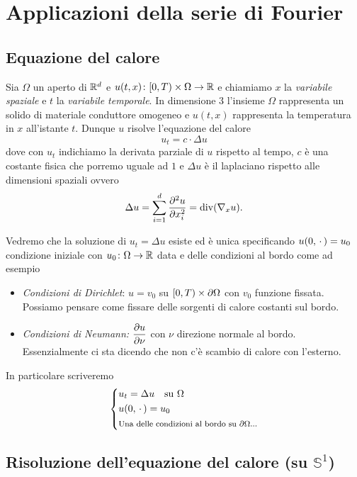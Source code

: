 \chapter{Applicazioni della serie di Fourier}

\section{Equazione del calore}

Sia $\Omega$ un aperto di $\mathbb R^d$ e $u(t, x) \colon [0, T) \times \Omega \to \mathbb R$ e chiamiamo $x$ la \textit{variabile spaziale} e $t$ la \textit{variabile temporale}. In dimensione $3$ l'insieme $\Omega$ rappresenta un solido di materiale conduttore omogeneo  e $u(t, x)$ rappresenta la temperatura in $x$ all'istante $t$. Dunque $u$ risolve l'equazione del calore
$$
	u_t = c \cdot \Delta u
$$
dove con $u_t$ indichiamo la derivata parziale di $u$ rispetto al tempo, $c$ è una costante fisica che porremo uguale ad $1$ e $\Delta u$ è il laplaciano rispetto alle dimensioni spaziali ovvero
$$
	\Delta u = \sum_{i=1}^d \frac{\partial^2 u}{\partial x_i^2} = \operatorname{div}(\nabla_x u).
$$

Vedremo che la soluzione di $u_t = \Delta u$ esiste ed è unica specificando $u(0, \,\cdot\,) = u_0$ condizione iniziale con $u_0 \colon \Omega \to \mathbb R$ data e delle condizioni al bordo come ad esempio
\begin{itemize}
	\item \textit{Condizioni di Dirichlet}: $u = v_0$ su $[0, T) \times \partial \Omega$ con $v_0$ funzione fissata. Possiamo pensare come fissare delle sorgenti di calore costanti sul bordo.
	\item \textit{Condizioni di Neumann:} $\displaystyle \frac{\partial u}{\partial \nu}$ con $\nu$ direzione normale al bordo. Essenzialmente ci sta dicendo che non c'è scambio di calore con l'esterno.
\end{itemize}
In particolare scriveremo
$$
\left\{
\begin{aligned}
	& u_t = \Delta u \quad \text{su $\Omega$} \\
	& u(0, \,\cdot\,) = u_0 \\
	& \text{\footnotesize Una delle condizioni al bordo su $\partial \Omega$...}
\end{aligned}
\right.
$$

\section{Risoluzione dell'equazione del calore (su $\mathbb S^1$)}

